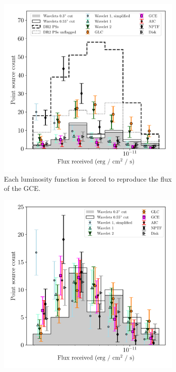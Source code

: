 \documentclass[letter,11pt]{article}
\begin{document}
\begin{figure}
    \centering
    \begin{subfigure}[b]{0.47\textwidth}
        \includegraphics[width=\textwidth]{figs/flux-distro-fix-flux.pdf}
        \caption{Each luminosity function is forced to reproduce the flux of the GCE.}
        \label{fig:flux-distro-fix-flux}
    \end{subfigure}
    \hfill
    \begin{subfigure}[b]{0.47\textwidth}
        \includegraphics[width=\textwidth]{figs/flux-distro-fix-count.pdf}

\end{subfigure}
\end{figure}
\end{document}
